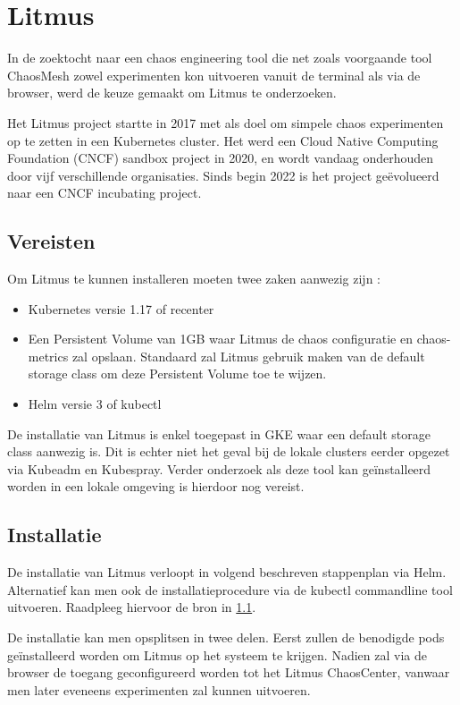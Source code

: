 \section{Litmus}

In de zoektocht naar een chaos engineering tool die net zoals voorgaande tool ChaosMesh zowel experimenten kon uitvoeren vanuit de terminal als via de browser, werd de keuze gemaakt om Litmus te onderzoeken. 

Het Litmus project startte in 2017 met als doel om simpele chaos experimenten op te zetten in een Kubernetes cluster. Het werd een Cloud Native Computing Foundation (CNCF) sandbox project in 2020, en wordt vandaag onderhouden door vijf verschillende organisaties. Sinds begin 2022 is het project geëvolueerd naar een CNCF incubating project. \autocite{CNCF2022}

\subsection {Vereisten}
\label{sec:vereisten}

Om Litmus te kunnen installeren moeten twee zaken aanwezig zijn \autocite{Litmus2022}: 
\begin{itemize}
    \item Kubernetes versie 1.17 of recenter
    \item Een Persistent Volume van 1GB waar Litmus de chaos configuratie en chaos-metrics zal opslaan. Standaard zal Litmus gebruik maken van de default storage class om deze Persistent Volume toe te wijzen.
    \item Helm versie 3 of kubectl 
\end{itemize}

De installatie van Litmus is enkel toegepast in GKE waar een default storage class aanwezig is. Dit is echter niet het geval bij de lokale clusters eerder opgezet via Kubeadm en Kubespray. Verder onderzoek als deze tool kan geïnstalleerd worden in een lokale omgeving is hierdoor nog vereist. 

\subsection{Installatie}

De installatie van Litmus verloopt in volgend beschreven stappenplan via Helm. Alternatief kan men ook de installatieprocedure via de kubectl commandline tool uitvoeren. Raadpleeg hiervoor de bron in \ref{sec:vereisten}.   

De installatie kan men opsplitsen in twee delen. Eerst zullen de benodigde pods geïnstalleerd worden om Litmus op het systeem te krijgen. Nadien zal via de browser de toegang geconfigureerd worden tot het Litmus ChaosCenter, vanwaar men later eveneens experimenten zal kunnen uitvoeren. 


